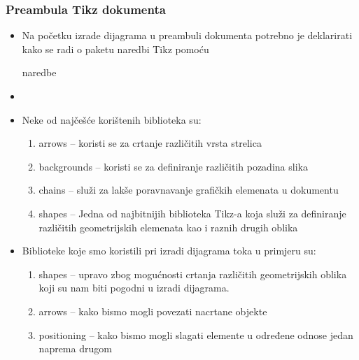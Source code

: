 \documentclass{beamer}
\begin{document}
	\begin{frame}
	\frametitle{Preambula Tikz dokumenta}
		\begin{itemize}
		\item Na početku izrade dijagrama u preambuli dokumenta potrebno je deklarirati kako se radi o paketu naredbi Tikz pomoću \usepackage{tikz} naredbe
		\item \usetikzlibrary{shapes, arrows, positioning}
		\item Neke od najčešće korištenih biblioteka su:
			\begin{enumerate}
				\item arrows – koristi se za crtanje različitih vrsta strelica
				\item backgrounds – koristi se za definiranje različitih pozadina slika
				\item chains – služi za lakše poravnavanje grafičkih elemenata u dokumentu
				\item shapes – Jedna od najbitnijih biblioteka Tikz-a koja služi za definiranje različitih geometrijskih elemenata kao i raznih drugih oblika 
			\end{enumerate}
		\item Biblioteke koje smo koristili pri izradi dijagrama toka u primjeru su:
			\begin{enumerate}
				\item shapes – upravo zbog mogućnosti crtanja različitih geometrijskih oblika koji su nam biti pogodni u izradi dijagrama.
				\item arrows – kako bismo mogli povezati nacrtane objekte
				\item positioning – kako bismo mogli slagati elemente u određene odnose jedan naprema drugom 
			\end{enumerate}
  		\end{itemize}	
	\end{frame}
\end{document}
